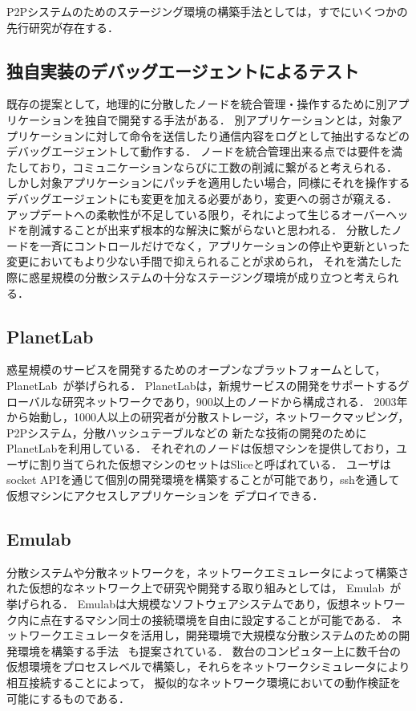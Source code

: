 P2Pシステムのためのステージング環境の構築手法としては，すでにいくつかの先行研究が存在する．

\subsection{独自実装のデバッグエージェントによるテスト}

既存の提案として，地理的に分散したノードを統合管理・操作するために別アプリケーションを独自で開発する手法がある．
別アプリケーションとは，対象アプリケーションに対して命令を送信したり通信内容をログとして抽出するなどのデバッグエージェントして動作する．
ノードを統合管理出来る点では要件を満たしており，コミュニケーションならびに工数の削減に繋がると考えられる．
しかし対象アプリケーションにパッチを適用したい場合，同様にそれを操作するデバッグエージェントにも変更を加える必要があり，変更への弱さが窺える．
アップデートへの柔軟性が不足している限り，それによって生じるオーバーヘッドを削減することが出来ず根本的な解決に繋がらないと思われる．
分散したノードを一斉にコントロールだけでなく，アプリケーションの停止や更新といった変更においてもより少ない手間で抑えられることが求められ，
それを満たした際に惑星規模の分散システムの十分なステージング環境が成り立つと考えられる．

\subsection{PlanetLab}
\label{consideration:related-works:planetlab}

惑星規模のサービスを開発するためのオープンなプラットフォームとして，PlanetLab~\cite{PlanetLab}が挙げられる．
PlanetLabは，新規サービスの開発をサポートするグローバルな研究ネットワークであり，900以上のノードから構成される．
2003年から始動し，1000人以上の研究者が分散ストレージ，ネットワークマッピング，P2Pシステム，分散ハッシュテーブルなどの
新たな技術の開発のためにPlanetLabを利用している．
それぞれのノードは仮想マシンを提供しており，ユーザに割り当てられた仮想マシンのセットはSliceと呼ばれている．
ユーザはsocket APIを通じて個別の開発環境を構築することが可能であり，sshを通して仮想マシンにアクセスしアプリケーションを
デプロイできる．

\subsection{Emulab}
\label{consideration:related-works:emulab}

分散システムや分散ネットワークを，ネットワークエミュレータによって構築された仮想的なネットワーク上で研究や開発する取り組みとしては，
Emulab~\cite{Emulab}が挙げられる．
Emulabは大規模なソフトウェアシステムであり，仮想ネットワーク内に点在するマシン同士の接続環境を自由に設定することが可能である．
ネットワークエミュレータを活用し，開発環境で大規模な分散システムのための開発環境を構築する手法
~\cite{RelatedWork1}も提案されている．
数台のコンピュター上に数千台の仮想環境をプロセスレベルで構築し，それらをネットワークシミュレータにより相互接続することによって，
擬似的なネットワーク環境においての動作検証を可能にするものである．

